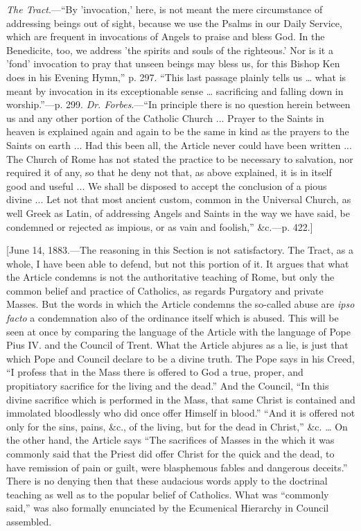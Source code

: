 \emph{The Tract}.—``By 'invocation,' here, is not meant the mere
circumstance of addressing beings out of sight, because we use the
Psalms in our Daily Service, which are frequent in invocations of
Angels to praise and bless God. In the Benedicite, too, we address
'the spirits and souls of the righteous.' Nor is it a 'fond'
invocation to pray that unseen beings may bless us, for this Bishop
Ken does in his Evening Hymn,'' p. 297. ``This last passage
plainly tells us … what is meant by invocation in its exceptionable
sense … sacrificing and falling down in worship.''—p. 299.
\emph{Dr. Forbes}.—``In principle there is no question herein
between us and any other portion of the Catholic Church ... Prayer to
the Saints in heaven is explained again and again to be the same in
kind as the prayers to the Saints on earth ... Had this been all, the
Article never could have been written ... The Church of Rome has not
stated the practice to be necessary to salvation, nor required it of
any, so that he deny not that, as above explained, it is in itself
good and useful ... We shall be disposed to accept the conclusion of a
pious divine ... Let not that most ancient custom, common in the
Universal Church, as well Greek as Latin, of addressing Angels and
Saints in the way we have said, be condemned or rejected as impious,
or as vain and foolish,'' \&c.—p. 422.]


[June 14, 1883.—The reasoning in this Section is not
satisfactory. The Tract, as a whole, I have been able to defend, but
not this portion of it. It argues that what the Article condemns is
not the authoritative teaching of Rome, but only the common belief and
practice of Catholics, as regards Purgatory and private Masses. But
the words in which the Article condemns the so-called abuse are \emph{ipso
facto} a condemnation also of the ordinance itself which is abused.
This will be seen at once by comparing the language of the Article
with the language of Pope Pius IV. and the Council of Trent. What the
Article abjures as a lie, is just that which Pope and Council declare
to be a divine truth. The Pope says in his Creed, ``I profess that
in the Mass there is offered to God a true, proper, and propitiatory
sacrifice for the living and the dead.'' And the Council, ``In
this divine sacrifice which is performed in the Mass, that same Christ
is contained and immolated bloodlessly who did once offer Himself in
blood.'' ``And it is offered not only for the sins, pains,
\&c., of the living, but for the dead in Christ,'' \&c. …
On the other hand, the Article says ``The sacrifices of
Masses in the which it was commonly said that the Priest did offer
Christ for the quick and the dead, to have remission of pain or guilt,
were blasphemous fables and dangerous deceits.'' There is no
denying then that these audacious words apply to the doctrinal
teaching as well as to the popular belief of Catholics. What was
``commonly said,'' was also formally enunciated by the
Ecumenical Hierarchy in Council assembled.

